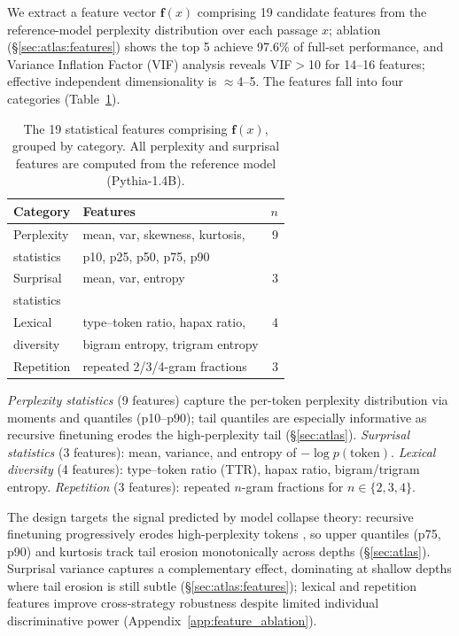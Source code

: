 We extract a feature vector $\mathbf{f}(x)$ comprising 19 candidate features from the reference-model perplexity distribution over each passage $x$; ablation (\S\ref{sec:atlas:features}) shows the top 5 achieve 97.6\% of full-set performance, and Variance Inflation Factor (VIF) analysis reveals VIF${>}$10 for 14--16 features; effective independent dimensionality is ${\approx}$4--5.
The features fall into four categories (Table~\ref{tab:features}).

\begin{table}[t]
\centering
\small
\caption{The 19 statistical features comprising $\mathbf{f}(x)$, grouped by category. All perplexity and surprisal features are computed from the reference model (Pythia-1.4B).}
\label{tab:features}
\begin{tabular*}{\columnwidth}{@{\extracolsep{\fill}}llr}
\toprule
Category & Features & $n$ \\
\midrule
Perplexity & mean, var, skewness, kurtosis, & 9 \\
statistics & p10, p25, p50, p75, p90 & \\
\addlinespace
Surprisal & mean, var, entropy & 3 \\
statistics & & \\
\addlinespace
Lexical & type--token ratio, hapax ratio, & 4 \\
diversity & bigram entropy, trigram entropy & \\
\addlinespace
Repetition & repeated 2/3/4-gram fractions & 3 \\
\bottomrule
\end{tabular*}
\end{table}

\emph{Perplexity statistics} (9 features) capture the per-token perplexity distribution via moments and quantiles (p10--p90); tail quantiles are especially informative as recursive finetuning erodes the high-perplexity tail (\S\ref{sec:atlas}).
\emph{Surprisal statistics} (3 features): mean, variance, and entropy of $-\log p(\text{token})$.
\emph{Lexical diversity} (4 features): type--token ratio (TTR), hapax ratio, bigram/trigram entropy.
\emph{Repetition} (3 features): repeated $n$-gram fractions for $n \in \{2, 3, 4\}$.

The design targets the signal predicted by model collapse theory: recursive finetuning progressively erodes high-perplexity tokens \cite{shumailov2024_nature}, so upper quantiles (p75, p90) and kurtosis track tail erosion monotonically across depths (\S\ref{sec:atlas}).
Surprisal variance captures a complementary effect, dominating at shallow depths where tail erosion is still subtle (\S\ref{sec:atlas:features}); lexical and repetition features improve cross-strategy robustness despite limited individual discriminative power (Appendix~\ref{app:feature_ablation}).

